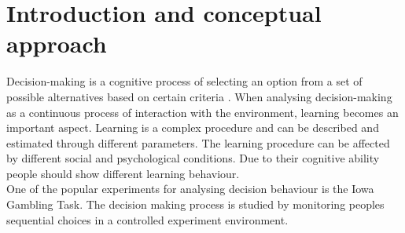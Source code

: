 \documentclass[12pt,a4paper,bibliography=totocnumbered,listof=totocnumbered]{scrartcl}
\begin{document}

\renewcommand{\sectionmark}[1]{\markright{#1}}
\renewcommand{\subsectionmark}[1]{}
\renewcommand{\subsubsectionmark}[1]{}
\rhead{\rightmark}

\onehalfspacing

\renewcommand{\thesection}{\arabic{section}}
\renewcommand{\theHsection}{\arabic{section}}
\setcounter{section}{0}
\setcounter{page}{1}




\section{Introduction and conceptual approach}

Decision-making is a cognitive process of selecting an option from a set of possible alternatives based on certain criteria \cite{Wang2007}. When analysing decision-making as a continuous process of interaction with the environment, learning becomes an important aspect. Learning is a complex procedure and can be described and estimated through different parameters. The learning procedure can be affected by different social and psychological conditions. Due to their cognitive ability people should show different learning behaviour.\\

One of the popular experiments for analysing decision behaviour is the Iowa Gambling Task. The decision making process is studied by monitoring peoples sequential choices in a controlled experiment environment.\\
\end{document}
